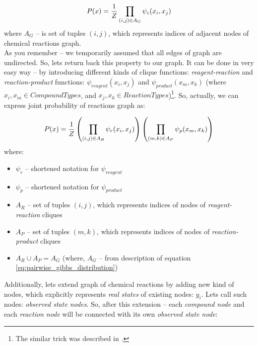 \documentclass[10pt]{article}
\begin{document}
\begin{equation} \label{eq:pairwise_gibbs_distribution}
P(x) = {1 \over Z} \prod_{(i,j) \in A_G} \psi_{c}(x_i, x_j)
\end{equation}
where $A_G$ -- is set of tuples $(i,j)$, which represents indices of adjacent nodes of chemical reactions graph. \\

As you remember -- we temporarily assumed that all edges of graph are undirected. So, lets return back this property to our graph. It can be done in very easy way -- by introducing different kinds of clique functions: \emph{reagent-reaction} and \emph{reaction-product} functions: $\psi_{reagent}(x_i, x_j)$ and $\psi_{product}(x_m, x_k)$ (where $x_i, x_m \in CompoundTypes$, and $x_j, x_k \in ReactionTypes$)\footnote{The similar trick was described in \cite{fraud_detection}.}. So, actually, we can express joint probability of reactions graph as:

\begin{equation}
P(x) = {1 \over Z} \left( \prod_{(i,j) \in A_R} \psi_{r}(x_i, x_j) \right) \left( \prod_{(m,k) \in A_P} \psi_{p}(x_m, x_k) \right)
\end{equation}
where:
\begin{itemize}
    \setlength \itemsep{0em}
    \item $\psi_{r}$ -- shortened notation for $\psi_{reagent}$
    \item $\psi_{p}$ -- shortened notation for $\psi_{product}$
    \item $A_R$ -- set of tuples $(i,j)$, which represents indices of nodes of \emph{reagent-reaction} cliques
    \item $A_P$ -- set of tuples $(m,k)$, which represents indices of nodes of \emph{reaction-product} cliques
    \item $A_R \cup A_P = A_G$ (where, $A_G$ -- from description of equation \eqref{eq:pairwise_gibbs_distribution})
\end{itemize}

Additionally, lets extend graph of chemical reactions by adding new kind of nodes, which explicitly represents \emph{real states} of existing nodes: $y_i$. Lets call such nodes: \emph{observed state nodes}. So, after this extension -- each \emph{compound node} and each \emph{reaction node} will be connected with its own \emph{observed state node}:
\end{document}

